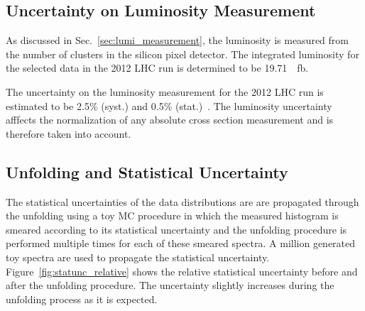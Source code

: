 \subsection {Uncertainty on Luminosity Measurement}

As discussed in Sec.~\ref{sec:lumi_measurement}, the luminosity is measured from
the number of clusters in the silicon pixel detector. The integrated luminosity
for the selected data in the 2012 LHC run is determined to be \SI{19.71}{\per
\femto \barn}. 

The uncertainty on the luminosity measurement for the 2012 LHC run is estimated
to be 2.5\% (syst.) and 0.5\% (stat.)~\cite{CMS-PAS-LUM-13-001}. The luminosity
uncertainty afffects the normalization of any absolute cross section measurement
and is therefore taken into account.

\subsection{Unfolding and Statistical Uncertainty}
\label{sec:stat_unf_uncert}

The statistical uncertainties of the data distributions are are propagated
through the unfolding using a toy MC procedure in which the measured histogram
is smeared according to its statistical uncertainty and the unfolding procedure
is performed multiple times for each of these smeared spectra. A million
generated toy spectra are used to propagate the statistical uncertainty.
Figure~\ref{fig:statunc_relative} shows the relative statistical uncertainty before and
after the unfolding procedure. The uncertainty slightly increases during the unfolding
process as it is expected.


